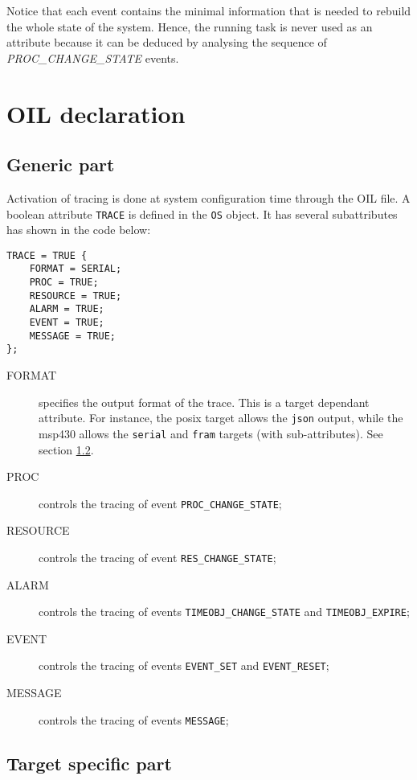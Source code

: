 Notice that each event contains the minimal information that is needed
to rebuild the whole state of the system.
Hence, the running task is never used as an attribute because it can be deduced
by analysing the sequence of \emph{PROC\_CHANGE\_STATE} events.

\section{OIL declaration}
\subsection{Generic part}

Activation of tracing is done at system configuration time through the OIL file.
A boolean attribute \texttt{TRACE} is defined in the \texttt{OS} object. It has
several subattributes has shown in the code below:

\begin{lstlisting}[language=OIL]
TRACE = TRUE {
    FORMAT = SERIAL;
    PROC = TRUE;
    RESOURCE = TRUE;
    ALARM = TRUE;
    EVENT = TRUE;
    MESSAGE = TRUE;
};
\end{lstlisting}

\begin{description}
	\item[FORMAT] specifies the output format of the trace. This is a target dependant attribute. For instance, the posix target allows the \texttt{json} output, while the msp430 allows the \texttt{serial} and \texttt{fram} targets (with sub-attributes). See section \ref{sec:traceTargetFormat}.

  \item[PROC] controls the tracing of event \texttt{PROC\_CHANGE\_STATE};

  \item[RESOURCE] controls the tracing of event \texttt{RES\_CHANGE\_STATE};

  \item[ALARM] controls the tracing of events \texttt{TIMEOBJ\_CHANGE\_STATE}
    and \texttt{TIMEOBJ\_EXPIRE};

  \item[EVENT]  controls the tracing of events \texttt{EVENT\_SET}
    and \texttt{EVENT\_RESET};
  
  \item[MESSAGE]  controls the tracing of events \texttt{MESSAGE};
\end{description}

\subsection{Target specific part}
\label{sec:traceTargetFormat}
